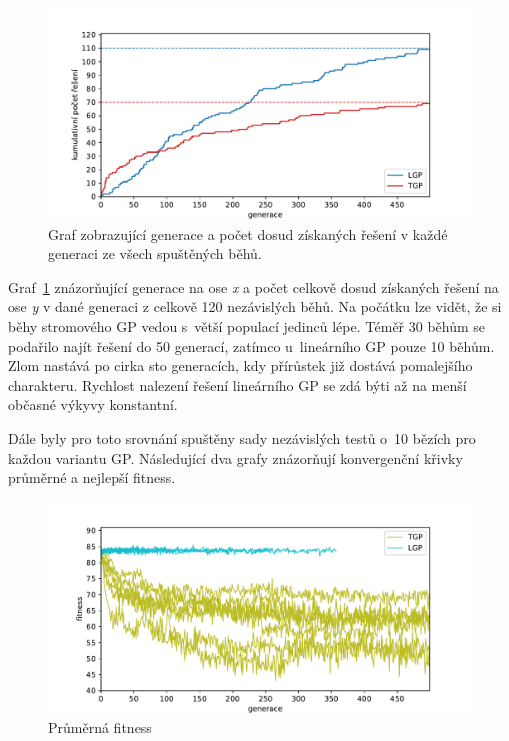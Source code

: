 \begin{figure}[!h]
    \centering
    \includegraphics[scale=0.7]{obrazky-figures/tgp-lgp-comp-cumulative.pdf}
    \caption{Graf zobrazující generace a počet dosud získaných řešení v každé generaci ze všech spuštěných běhů.}
    \label{fig:tgp-lgp-comp-cumulative}
\end{figure}

Graf~\ref{fig:tgp-lgp-comp-cumulative} znázorňující generace na ose \emph{x} a počet celkově dosud získaných řešení na ose \emph{y} v dané generaci z celkově 120 nezávislých běhů. Na počátku lze vidět, že si běhy stromového GP vedou s~větší populací jedinců lépe. Téměř 30 běhům se podařilo najít řešení do 50 generací, zatímco u~lineárního GP pouze 10 běhům. Zlom nastává po cirka sto generacích, kdy přírůstek již dostává pomalejšího charakteru. Rychlost nalezení řešení lineárního GP se zdá býti až na menší občasné výkyvy konstantní.

\newpage
Dále byly pro toto srovnání spuštěny sady nezávislých testů o~10 bězích pro každou variantu GP. Následující dva grafy znázorňují konvergenční křivky průměrné a nejlepší fitness.

\begin{figure}[!h]
    \centering
    \includegraphics[scale=0.7]{obrazky-figures/tgp-lgp-comp-avg-fitness.pdf}
    \caption{Průměrná fitness
    }
    \label{fig:tgp-lgp-comp-avg-fitness}
\end{figure}  

